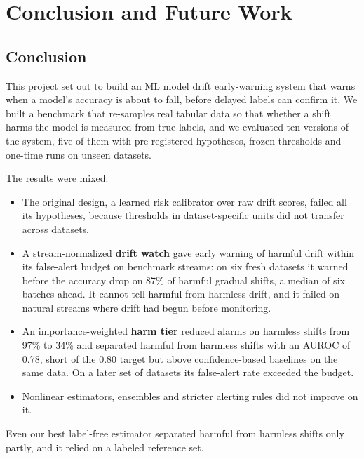 
\chapter{Conclusion and Future Work}
\label{ch:conclusion}

\section{Conclusion}
This project set out to build an ML model drift early-warning system that warns when a model's accuracy is about to fall, before delayed labels can confirm it. We built a benchmark that re-samples real tabular data so that whether a shift harms the model is measured from true labels, and we evaluated ten versions of the system, five of them with pre-registered hypotheses, frozen thresholds and one-time runs on unseen datasets.

The results were mixed:
\begin{itemize}
\item The original design, a learned risk calibrator over raw drift scores, failed all its hypotheses, because thresholds in dataset-specific units did not transfer across datasets.
\item A stream-normalized \textbf{drift watch} gave early warning of harmful drift within its false-alert budget on benchmark streams: on six fresh datasets it warned before the accuracy drop on 87\% of harmful gradual shifts, a median of six batches ahead. It cannot tell harmful from harmless drift, and it failed on natural streams where drift had begun before monitoring.
\item An importance-weighted \textbf{harm tier} reduced alarms on harmless shifts from 97\% to 34\% and separated harmful from harmless shifts with an AUROC of 0.78, short of the 0.80 target but above confidence-based baselines on the same data. On a later set of datasets its false-alert rate exceeded the budget.
\item Nonlinear estimators, ensembles and stricter alerting rules did not improve on it.
\end{itemize}
Even our best label-free estimator separated harmful from harmless shifts only partly, and it relied on a labeled reference set.

